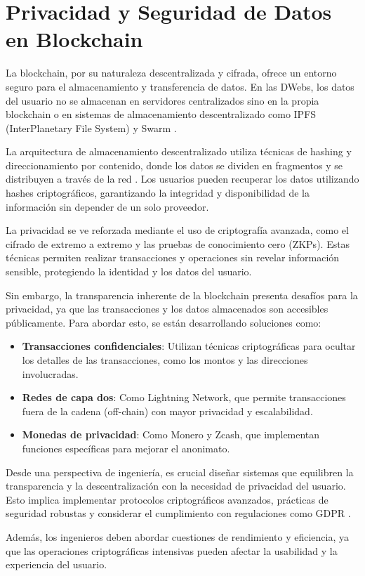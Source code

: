 \section{Privacidad y Seguridad de Datos en Blockchain}

La blockchain, por su naturaleza descentralizada y cifrada, ofrece un entorno seguro para el almacenamiento y transferencia de datos. En las DWebs, los datos del usuario no se almacenan en servidores centralizados sino en la propia blockchain o en sistemas de almacenamiento descentralizado como IPFS (InterPlanetary File System) \cite{benet2014ipfs} y Swarm \cite{swarm2016}.

La arquitectura de almacenamiento descentralizado utiliza técnicas de hashing y direccionamiento por contenido, donde los datos se dividen en fragmentos y se distribuyen a través de la red \cite{benet2014ipfs}. Los usuarios pueden recuperar los datos utilizando hashes criptográficos, garantizando la integridad y disponibilidad de la información sin depender de un solo proveedor.

La privacidad se ve reforzada mediante el uso de criptografía avanzada, como el cifrado de extremo a extremo y las pruebas de conocimiento cero (ZKPs). Estas técnicas permiten realizar transacciones y operaciones sin revelar información sensible, protegiendo la identidad y los datos del usuario.

Sin embargo, la transparencia inherente de la blockchain presenta desafíos para la privacidad, ya que las transacciones y los datos almacenados son accesibles públicamente. Para abordar esto, se están desarrollando soluciones como:

\begin{itemize}
    \item \textbf{Transacciones confidenciales}: Utilizan técnicas criptográficas para ocultar los detalles de las transacciones, como los montos y las direcciones involucradas.
    \item \textbf{Redes de capa dos}: Como Lightning Network, que permite transacciones fuera de la cadena (off-chain) con mayor privacidad y escalabilidad.
    \item \textbf{Monedas de privacidad}: Como Monero y Zcash, que implementan funciones específicas para mejorar el anonimato.
\end{itemize}

Desde una perspectiva de ingeniería, es crucial diseñar sistemas que equilibren la transparencia y la descentralización con la necesidad de privacidad del usuario. Esto implica implementar protocolos criptográficos avanzados, prácticas de seguridad robustas y considerar el cumplimiento con regulaciones como GDPR \cite{finck2018blockchain}.

Además, los ingenieros deben abordar cuestiones de rendimiento y eficiencia, ya que las operaciones criptográficas intensivas pueden afectar la usabilidad y la experiencia del usuario.


